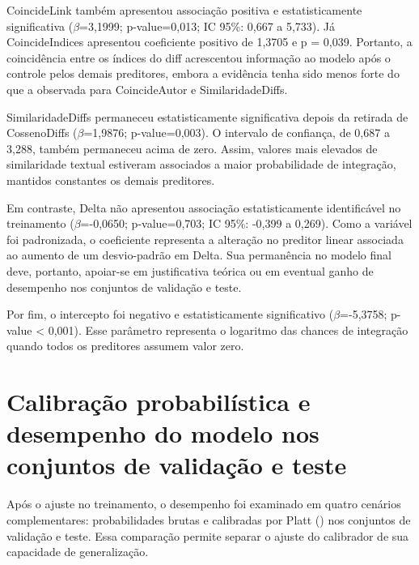 CoincideLink também apresentou associação positiva e estatisticamente significativa ($\beta$=3,1999; p-value=0,013; IC 95\%: 0,667 a 5,733). Já CoincideIndices apresentou coeficiente positivo de 1,3705 e p = 0,039. Portanto, a coincidência entre os índices do diff acrescentou informação ao modelo após o controle pelos demais preditores, embora a evidência tenha sido menos forte do que a observada para CoincideAutor e SimilaridadeDiffs.

SimilaridadeDiffs permaneceu estatisticamente significativa depois da retirada de CossenoDiffs ($\beta$=1,9876; p-value=0,003). O intervalo de confiança, de 0,687 a 3,288, também permaneceu acima de zero. Assim, valores mais elevados de similaridade textual estiveram associados a maior probabilidade de integração, mantidos constantes os demais preditores.

Em contraste, Delta não apresentou associação estatisticamente identificável no treinamento ($\beta$=-0,0650; p-value=0,703; IC 95\%: -0,399 a 0,269). Como a variável foi padronizada, o coeficiente representa a alteração no preditor linear associada ao aumento de um desvio-padrão em Delta. Sua permanência no modelo final deve, portanto, apoiar-se em justificativa teórica ou em eventual ganho de desempenho nos conjuntos de validação e teste.

Por fim, o intercepto foi negativo e estatisticamente significativo ($\beta$=-5,3758; p-value \textless{} 0,001). Esse parâmetro representa o logaritmo das chances de integração quando todos os preditores assumem valor zero.

\section{Calibração probabilística e desempenho do modelo nos conjuntos de validação e teste}

Após o ajuste no treinamento, o desempenho foi examinado em quatro cenários complementares: probabilidades brutas e calibradas por  Platt (\cite{niculescu2005probabilities}) nos conjuntos de validação e teste. Essa comparação permite separar o ajuste do calibrador de sua capacidade de generalização.

